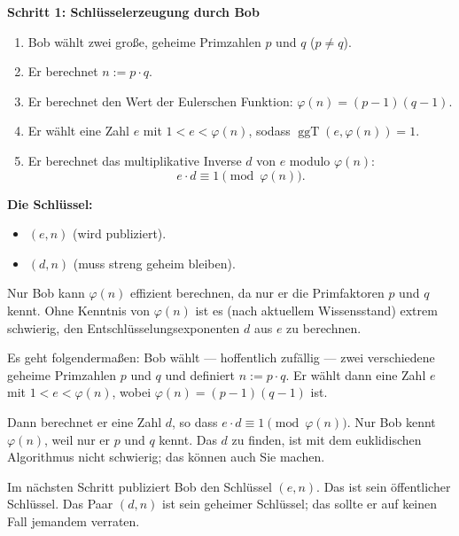 \begin{math-stroke}
\textbf{Schritt 1: Schlüsselerzeugung durch Bob}
\begin{enumerate}[label=\textbf{(\arabic*)}]
    \item Bob wählt zwei große, geheime Primzahlen $p$ und $q$ ($p \neq q$).
    \item Er berechnet $n := p \cdot q$.
    \item Er berechnet den Wert der Eulerschen Funktion: $\varphi(n) = (p-1)(q-1)$.
    \item Er wählt eine Zahl $e$ mit $1 < e < \varphi(n)$, sodass $\operatorname{ggT}(e, \varphi(n)) = 1$.
    \item Er berechnet das multiplikative Inverse $d$ von $e$ modulo $\varphi(n)$:
    \begin{equation}\label{eq:rsa-d}
    e \cdot d \equiv 1 \pmod{\varphi(n)}.
    \end{equation}
\end{enumerate}

\textbf{Die Schlüssel:}
\begin{itemize}
    \item {} $(e, n)$ (wird publiziert).
    \item {} $(d, n)$ (muss streng geheim bleiben).
\end{itemize}

\begin{explanation-of-steps}
Nur Bob kann $\varphi(n)$ effizient berechnen, da nur er die Primfaktoren $p$ und $q$ kennt. Ohne Kenntnis von $\varphi(n)$ ist es (nach aktuellem Wissensstand) extrem schwierig, den Entschlüsselungsexponenten $d$ aus $e$ zu berechnen.
\end{explanation-of-steps}
\end{math-stroke}

\begin{spoken-clean}[01:23:24 - 01:25:54]
Es geht folgendermaßen: Bob wählt --- hoffentlich zufällig --- zwei verschiedene geheime Primzahlen $p$ und $q$ und definiert $n := p \cdot q$. Er wählt dann eine Zahl $e$ mit $1 < e < \varphi(n)$, wobei $\varphi(n) = (p - 1)(q - 1)$ ist.

Dann berechnet er eine Zahl $d$, so dass $e \cdot d \equiv 1 \pmod{\varphi(n)}$. Nur Bob kennt $\varphi(n)$, weil nur er $p$ und $q$ kennt. Das $d$ zu finden, ist mit dem euklidischen Algorithmus nicht schwierig; das können auch Sie machen.

Im nächsten Schritt publiziert Bob den Schlüssel $(e, n)$. Das ist sein öffentlicher Schlüssel. Das Paar $(d, n)$ ist sein geheimer Schlüssel; das sollte er auf keinen Fall jemandem verraten.
\end{spoken-clean}

